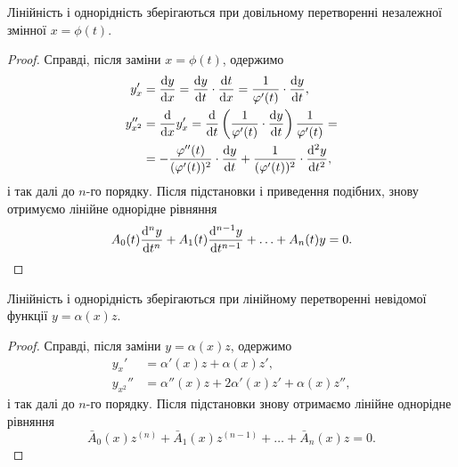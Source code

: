 \begin{theorem}
	Лінійність і однорідність зберігаються при довільному перетворенні незалежної змінної $x = \phi(t)$.
\end{theorem}

\begin{proof}
	Справді, після заміни $x = \phi(t)$, одержимо
	\begin{align*}
		y_x' &= \frac{\diff y}{\diff x} = \frac{\diff y}{\diff t} \cdot \frac{\diff t}{\diff x} = \frac{1}{\phi'(t)} \cdot \frac{\diff y}{\diff t}, \\
		y_{x^2}'' &= \frac{\diff}{\diff x} y_x' = \frac{\diff}{\diff t} \left( \frac{1}{\phi'(t)} \cdot \frac{\diff y}{\diff t} \right) \frac{1}{\phi'(t)} = \\
		&= - \frac{\phi''(t)}{(\phi'(t))^2} \cdot \frac{\diff y}{\diff t} + \frac{1}{(\phi'(t))^2} \cdot \frac{\diff^2 y}{\diff t^2}, \nonumber
	\end{align*}
	і так далі до $n$-го порядку. Після підстановки і приведення подібних, знову отримуємо лінійне однорідне рівняння
	\begin{equation*}
		A_0(t) \frac{\mathop{}\!\mathrm{d}^n y}{\mathop{}\!\mathrm{d} t^n} + A_1(t) \frac{\mathop{}\!\mathrm{d}^{n - 1} y}{\mathop{}\!\mathrm{d} t^{n - 1}} + \ldots + A_n(t) y = 0.
	\end{equation*}
\end{proof}

\begin{theorem}
	Лінійність і однорідність зберігаються при лінійному перетворенні невідомої функції $y = \alpha (x) z$.
\end{theorem}

\begin{proof}
	Справді, після заміни $y = \alpha (x) z$, одержимо
	\begin{align*}
		y_x' &= \alpha'(x) z + \alpha(x) z', \\
		y_{x^2}'' &= \alpha''(x) z + 2 \alpha'(x) z' + \alpha(x) z'',
	\end{align*}
	і так далі до $n$-го порядку. Після підстановки знову отримаємо лінійне однорідне рівняння
	\begin{equation*}
		\bar A_0(x) z^{(n)} + \bar A_1(x) z^{(n - 1)} + \ldots + \bar A_n(x) z = 0.
	\end{equation*}
\end{proof}